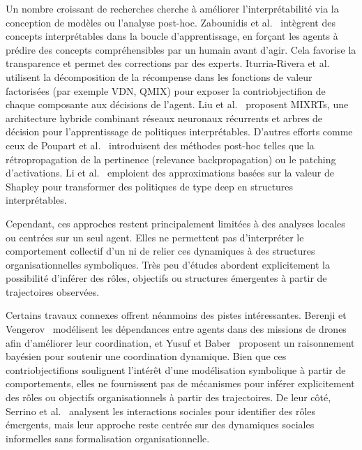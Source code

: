 Un nombre croissant de recherches cherche à améliorer l'interprétabilité via la conception de modèles ou l'analyse post-hoc. Zabounidis et al.~\cite{zabounidis2023concept} intègrent des concepts interprétables dans la boucle d'apprentissage, en forçant les agents à prédire des concepts compréhensibles par un humain avant d'agir. Cela favorise la transparence et permet des corrections par des experts. Iturria-Rivera et al.~\cite{iturria2024explainable} utilisent la décomposition de la récompense dans les fonctions de valeur factorisées (par exemple VDN, QMIX) pour exposer la contriobjectifion de chaque composante aux décisions de l'agent. Liu et al.~\cite{liu2025} proposent MIXRTs, une architecture hybride combinant réseaux neuronaux récurrents et arbres de décision pour l'apprentissage de politiques interprétables. D'autres efforts comme ceux de Poupart et al.~\cite{poupart2025perspectives} introduisent des méthodes post-hoc telles que la rétropropagation de la pertinence (relevance backpropagation) ou le patching d'activations. Li et al.~\cite{li2025from} emploient des approximations basées sur la valeur de Shapley pour transformer des politiques de type deep  en structures interprétables.

Cependant, ces approches restent principalement limitées à des analyses locales ou centrées sur un seul agent. Elles ne permettent pas d'interpréter le comportement collectif d'un  ni de relier ces dynamiques à des structures organisationnelles symboliques. Très peu d'études abordent explicitement la possibilité d'inférer des rôles, objectifs ou structures émergentes à partir de trajectoires observées.

Certains travaux connexes offrent néanmoins des pistes intéressantes. Berenji et Vengerov~\cite{berenji2000learning} modélisent les dépendances entre agents dans des missions de drones afin d'améliorer leur coordination, et Yusuf et Baber~\cite{yusuf2020inferential} proposent un raisonnement bayésien pour soutenir une coordination dynamique. Bien que ces contriobjectifions soulignent l'intérêt d'une modélisation symbolique à partir de comportements, elles ne fournissent pas de mécanismes pour inférer explicitement des rôles ou objectifs organisationnels à partir des trajectoires. De leur côté, Serrino et al.~\cite{serrino2019finding} analysent les interactions sociales pour identifier des rôles émergents, mais leur approche reste centrée sur des dynamiques sociales informelles sans formalisation organisationnelle.

